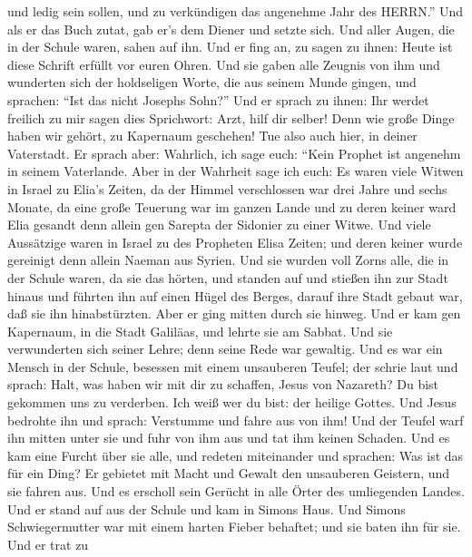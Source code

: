 und ledig sein sollen,  und zu verkündigen das angenehme
Jahr des HERRN.''  Und als er das Buch zutat, gab er's dem
Diener und setzte sich. Und aller Augen, die in der Schule waren, sahen
auf ihn.  Und er fing an, zu sagen zu ihnen: Heute ist
diese Schrift erfüllt vor euren Ohren.  Und sie gaben alle
Zeugnis von ihm und wunderten sich der holdseligen Worte, die aus seinem
Munde gingen, und sprachen: ``Ist das nicht Josephs Sohn?''
 Und er sprach zu ihnen: Ihr werdet freilich zu mir sagen
dies Sprichwort: Arzt, hilf dir selber! Denn wie große Dinge haben wir
gehört, zu Kapernaum geschehen! Tue also auch hier, in deiner
Vaterstadt.  Er sprach aber: Wahrlich, ich sage euch:
``Kein Prophet ist angenehm in seinem Vaterlande.  Aber in
der Wahrheit sage ich euch: Es waren viele Witwen in Israel zu Elia's
Zeiten, da der Himmel verschlossen war drei Jahre und sechs Monate, da
eine große Teuerung war im ganzen Lande  und zu deren
keiner ward Elia gesandt denn allein gen Sarepta der Sidonier zu einer
Witwe.  Und viele Aussätzige waren in Israel zu des
Propheten Elisa Zeiten; und deren keiner wurde gereinigt denn allein
Naeman aus Syrien.  Und sie wurden voll Zorns alle, die in
der Schule waren, da sie das hörten,  und standen auf und
stießen ihn zur Stadt hinaus und führten ihn auf einen Hügel des Berges,
darauf ihre Stadt gebaut war, daß sie ihn hinabstürzten. 
Aber er ging mitten durch sie hinweg.  Und er kam gen
Kapernaum, in die Stadt Galiläas, und lehrte sie am Sabbat.
 Und sie verwunderten sich seiner Lehre; denn seine Rede
war gewaltig.  Und es war ein Mensch in der Schule,
besessen mit einem unsauberen Teufel; der schrie laut  und
sprach: Halt, was haben wir mit dir zu schaffen, Jesus von Nazareth? Du
bist gekommen uns zu verderben. Ich weiß wer du bist: der heilige
Gottes.  Und Jesus bedrohte ihn und sprach: Verstumme und
fahre aus von ihm! Und der Teufel warf ihn mitten unter sie und fuhr von
ihm aus und tat ihm keinen Schaden.  Und es kam eine Furcht
über sie alle, und redeten miteinander und sprachen: Was ist das für ein
Ding? Er gebietet mit Macht und Gewalt den unsauberen Geistern, und sie
fahren aus.  Und es erscholl sein Gerücht in alle Örter des
umliegenden Landes.  Und er stand auf aus der Schule und
kam in Simons Haus. Und Simons Schwiegermutter war mit einem harten
Fieber behaftet; und sie baten ihn für sie.  Und er trat zu
